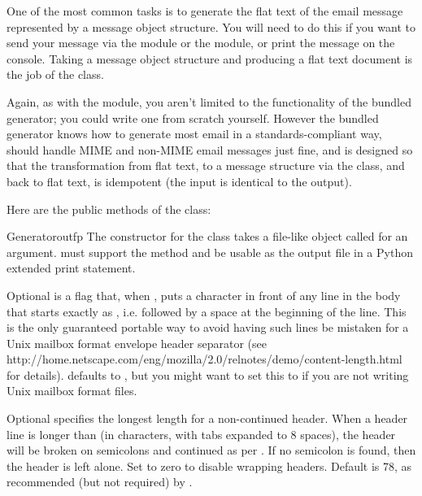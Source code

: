 
One of the most common tasks is to generate the flat text of the email
message represented by a message object structure.  You will need to do
this if you want to send your message via the 
module or the  module, or print the message on the
console.  Taking a message object structure and producing a flat text
document is the job of the  class.

Again, as with the  module, you aren't limited
to the functionality of the bundled generator; you could write one
from scratch yourself.  However the bundled generator knows how to
generate most email in a standards-compliant way, should handle MIME
and non-MIME email messages just fine, and is designed so that the
transformation from flat text, to a message structure via the
 class, and back to flat text, is idempotent (the input
is identical to the output).

Here are the public methods of the  class:

\begin{classdesc}{Generator}{outfp}
The constructor for the  class takes a file-like
object called  for an argument.   must support
the  method and be usable as the output file in a
Python extended print statement.

Optional  is a flag that, when , puts a
\samp{>} character in front of any line in the body that starts exactly as
, i.e.  followed by a space at the beginning of the
line.  This is the only guaranteed portable way to avoid having such
lines be mistaken for a Unix mailbox format envelope header separator (see
{http://home.netscape.com/eng/mozilla/2.0/relnotes/demo/content-length.html}
for details).   defaults to , but you
might want to set this to  if you are not writing Unix
mailbox format files.

Optional  specifies the longest length for a
non-continued header.  When a header line is longer than
 (in characters, with tabs expanded to 8 spaces),
the header will be broken on semicolons and continued as per
.  If no semicolon is found, then the header is left alone.
Set to zero to disable wrapping headers.  Default is 78, as
recommended (but not required) by .
\end{classdesc}

